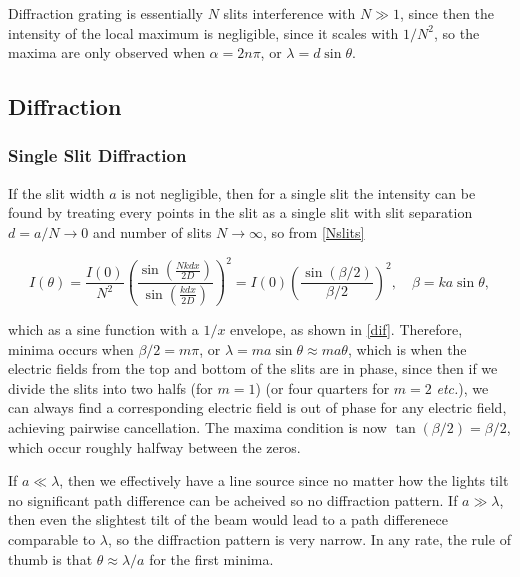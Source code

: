 \documentclass[english,a4paper,12pt]{report}
\begin{document}


Diffraction grating is essentially \(N\) slits interference with \(N \gg 1\), since then the intensity of the local maximum is negligible, since it scales with \(1/N^2\), so the maxima are only observed when \(\alpha = 2n\pi \), or \(\lambda = d\sin \theta \).    


\subsection{Diffraction}

\subsubsection{Single Slit Diffraction}

If the slit width \(a\) is not negligible, then for a single slit the intensity can be found by treating every points in the slit as a single slit with slit separation \(d = a /N \to 0\) and number of slits \(N \to \infty\), so from \cref{Nslits} 

\begin{equation}
    I(\theta ) =  \frac{I(0)}{N^2}  \left( \frac{\sin \left( \frac{Nkdx}{2D}  \right)}{\sin \left( \frac{kdx}{2D}  \right)}  \right)^2 = I(0) \left( \frac{\sin \left( \beta /2  \right)}{\beta /2 }  \right)^2, \quad \beta  = ka\sin \theta , \label{diffraction} 
\end{equation}

which as a sine function with a \(1/x\) envelope, as shown in \cref{dif}. Therefore, minima occurs when \(\beta /2 = m\pi \), or \(\lambda = ma \sin \theta \approx ma \theta \), which is when the electric fields from the top and bottom of the slits are in phase, since then if we divide the slits into two halfs (for \(m=1\)) (or four quarters for \(m=2\) \textit{etc.}), we can always find a corresponding electric field is out of phase for any electric field, achieving pairwise cancellation. The maxima condition is now \(\tan (\beta /2) = \beta /2\), which occur roughly halfway between the zeros. 

If \(a \ll \lambda \), then we effectively have a line source since no matter how the lights tilt no significant path difference can be acheived so no diffraction pattern. If \(a \gg  \lambda \), then even the slightest tilt of the beam would lead to a path differenece comparable to \(\lambda \), so the diffraction pattern is very narrow. In any rate, the rule of thumb is that \(\theta \approx  \lambda /a\) for the first minima.    
\end{document}
